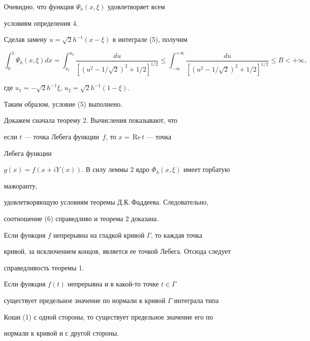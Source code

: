  


\begin{pf} 


Очевидно, что функция $\Psi_h(x,\xi)$ удовлетворяет всем 


условиям определения 4. 


 


Сделав замену $u=\sqrt{2}h^{-1}(x-\xi)$ в интеграле (5), получим 


$$ 


\int^1_0\Psi_h(x,\xi)dx=\int^{u_2}_{u_1} 


\frac{du}{[(u^2-1/\sqrt{2})^2+1/2]^{1/2}}\le 


\int^{+\infty}_{-\infty}\frac{du} 


{[(u^2-1/\sqrt{2})^2+1/2]^{1/2}}\le B<+\infty, 


$$ 


где $u_1=-\sqrt{2}h^{-1}\xi$, $u_2=\sqrt{2}h^{-1}(1-\xi)$. 


Таким образом, условие (5) выполнено. 


\end{pf} 


 


Докажем сначала теорему 2. Вычисления показывают, что 


если $t$ --- точка Лебега функции~$f$, то $x=\,{\mathrm{Re}}\,t$ --- точка 


Лебега функции 


$g(x)=f(x+iY(x))$. В силу леммы 2 ядро $\Phi_h(x,\xi)$ имеет горбатую 


мажоранту, 


удовлетворяющую условиям теоремы Д.К.\,Фаддеева. Следовательно, 


соотношение (6) справедливо и теорема 2 доказана. 


 


Если функция $f$ непрерывна на гладкой кривой $\Gamma$, то каждая точка 


кривой, за исключением концов, является ее точкой Лебега. Отсюда следует 


справедливость теоремы 1. 


 


\begin{cor} 


Если функция $f(t)$ непрерывна и в какой-то точке $t\in\Gamma$ 


существует предельное значение по нормали к кривой $\Gamma$ интеграла типа 


Коши (1) с одной стороны, то существует предельное значение его по 


нормали к кривой и с другой стороны. 


\end{cor} 


